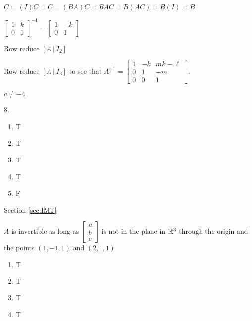 \begin{multicols}{2}
\obe


\item $C = (I)C = C = (BA)C = BAC = B(AC) =  B(I) = B$

\item 
\ba 
\item $\left[ \begin{array}{cc} 1&k \\ 0&1 \end{array} \right]^{-1} =  \left[ \begin{array}{cr} 1&-k \\ 0&1 \end{array} \right]$ 

\item Row reduce  $[A \ | \ I_2]$

\item Row reduce $[A \ | \ I_3]$ to see that  $A^{-1} =  \left[ \begin{array}{crc} 1&-k&mk-\ell \\ 0&1&-m \\ 0&0&1 \end{array} \right]$.

\ea

\item $c \neq -4$ 


\oee

\be
\item[8.]
\begin{enumerate}[label=(\alph*), leftmargin=1\parindent]
\item T
\item T
\item T
\item T
\item F
 
\end{enumerate}

\ee

\hspace{-0.25in} Section \ref{sec:IMT}

\obe
\item  $A$ is invertible as long as $\left[ \begin{array}{c} a \\ b\\ c\end{array} \right]$ is not in the plane in $\mathbb{R}^3$ through the origin and the points $(1,-1,1)$ and $(2,1,1)$

\item 
\begin{enumerate}[label=(\alph*), leftmargin=1\parindent]
\item  T
\item T
\item T
\item T


\end{enumerate}
\end{multicols}
